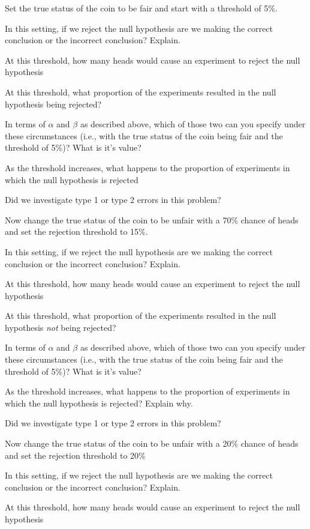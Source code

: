 \documentclass[
]{book}
\theoremstyle{definition}
\theoremstyle{definition}
\theoremstyle{definition}
\theoremstyle{remark}
\begin{document}
Set the true status of the coin to be fair and start with a threshold of 5\%.

In this setting, if we reject the null hypothesis are we making the correct conclusion or the incorrect conclusion? Explain.

At this threshold, how many heads would cause an experiment to reject the null hypothesis

At this threshold, what proportion of the experiments resulted in the null hypothesis being rejected?

In terms of \(\alpha\) and \(\beta\) as described above, which of those two can you specify under these circumstances (i.e., with the true status of the coin being fair and the threshold of 5\%)? What is it's value?

As the threshold increases, what happens to the proportion of experiments in which the null hypothesis is rejected

Did we investigate type 1 or type 2 errors in this problem?

Now change the true status of the coin to be unfair with a 70\% chance of heads and set the rejection threshold to 15\%.

In this setting, if we reject the null hypothesis are we making the correct conclusion or the incorrect conclusion? Explain.

At this threshold, how many heads would cause an experiment to reject the null hypothesis

At this threshold, what proportion of the experiments resulted in the null hypothesis \emph{not} being rejected?

In terms of \(\alpha\) and \(\beta\) as described above, which of those two can you specify under these circumstances (i.e., with the true status of the coin being fair and the threshold of 5\%)? What is it's value?

As the threshold increases, what happens to the proportion of experiments in which the null hypothesis is rejected? Explain why.

Did we investigate type 1 or type 2 errors in this problem?

Now change the true status of the coin to be unfair with a 20\% chance of heads and set the rejection threshold to 20\%

In this setting, if we reject the null hypothesis are we making the correct conclusion or the incorrect conclusion? Explain.

At this threshold, how many heads would cause an experiment to reject the null hypothesis
\end{document}
